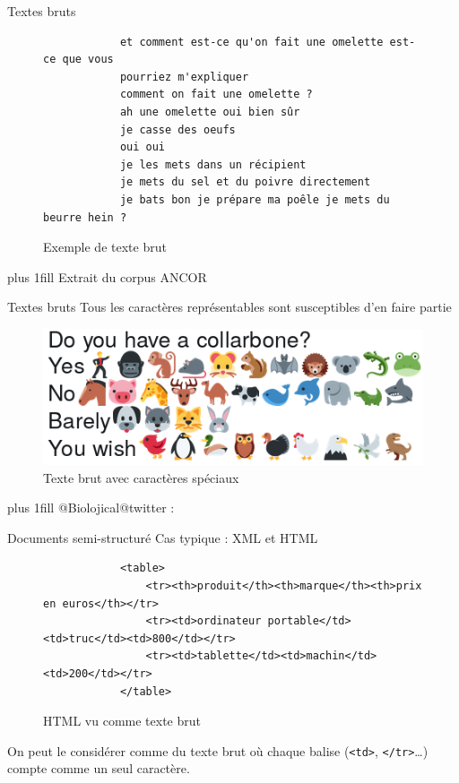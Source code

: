 \documentclass[hyperref={unicode}, xcolor={svgnames}, french]{beamer}
\begin{document}
\begin{frame}[fragile=singleslide]{Textes bruts}
    \begin{figure}
        \begin{verbatim}
            et comment est-ce qu'on fait une omelette est-ce que vous
            pourriez m'expliquer
            comment on fait une omelette ?
            ah une omelette oui bien sûr
            je casse des oeufs
            oui oui
            je les mets dans un récipient
            je mets du sel et du poivre directement
            je bats bon je prépare ma poêle je mets du beurre hein ?
        \end{verbatim}
        \caption{Exemple de texte brut}
    \end{figure}
    \vskip0pt plus 1fill
    {\tiny Extrait du corpus ANCOR \parencite{muzerelle2013ANCOR}}
\end{frame}

\begin{frame}{Textes bruts}
    \alert{Tous} les caractères représentables sont susceptibles d'en faire partie
    \begin{figure}
        \includegraphics[width=\textwidth, height=0.8\textheight, keepaspectratio]{pics/raw_emoji.png}
        \caption{Texte brut avec caractères spéciaux}
    \end{figure}
    \vskip0pt plus 1fill
    {\tiny @Biolojical@twitter : }
\end{frame}

\begin{frame}[fragile=singleslide]{Documents semi-structuré}
    Cas typique : XML et HTML
    \begin{figure}
        \begin{verbatim}
            <table>
                <tr><th>produit</th><th>marque</th><th>prix en euros</th></tr>
                <tr><td>ordinateur portable</td><td>truc</td><td>800</td></tr>
                <tr><td>tablette</td><td>machin</td><td>200</td></tr>
            </table>
        \end{verbatim}
        \caption{HTML vu comme texte brut}
    \end{figure}
    On peut le considérer comme du texte brut où chaque balise (\texttt{<td>}, \texttt{</tr>}…) compte comme un seul caractère.
\end{frame}
\end{document}
